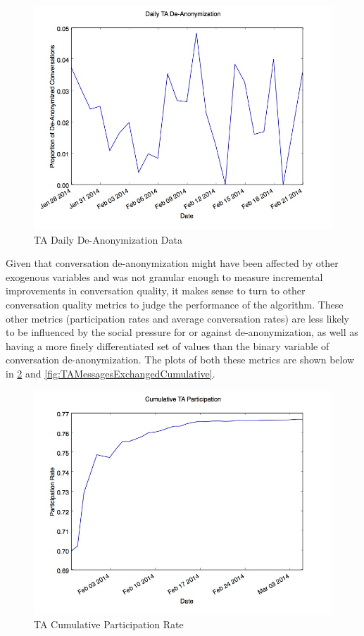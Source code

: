 \begin{figure}[htb]
\centering
\includegraphics[trim= 0mm 0mm 0mm 0mm, clip, scale=0.5]{./Figures/DailyTADe-Anonymization.jpg}
\caption{TA Daily De-Anonymization Data}
\label{fig:TADe-AnonymizationDaily}
\end{figure}

Given that conversation de-anonymization might have been affected by other exogenous variables and was not granular enough to measure incremental improvements in conversation quality, it makes sense to turn to other conversation quality metrics to judge the performance of the algorithm. These other metrics (participation rates and average conversation rates) are less likely to be influenced by the social pressure for or against de-anonymization, as well as having a more finely differentiated set of values than the binary variable of conversation de-anonymization. The plots of both these metrics are shown below in \ref{fig:TAParticipationCumulative} and \ref{fig:TAMessagesExchangedCumulative}.

\begin{figure}[H]
\centering
\includegraphics[trim= 0mm 0mm 0mm 0mm, clip, scale=0.5]{./Figures/CumulativeTAParticipation.jpg}
\caption{TA Cumulative Participation Rate}
\label{fig:TAParticipationCumulative}
\end{figure}

